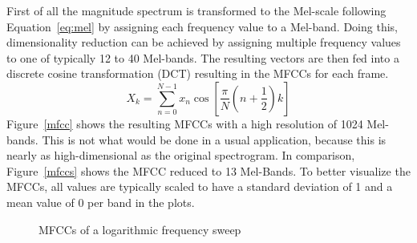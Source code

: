 \FloatBarrier
\noindent First of all the magnitude spectrum is transformed to the Mel-scale following Equation~\eqref{eq:mel} by assigning each frequency value to a Mel-band.
Doing this, dimensionality reduction can be achieved by assigning multiple frequency values to one of typically 12 to 40 Mel-bands. The resulting vectors are then fed into a discrete cosine transformation (DCT) resulting in the MFCCs for each frame. 
\begin{equation} \label{eq:dct}
X_k = \sum_{n=0}^{N-1}{x_n \cos\left[{\frac{\pi}{N}(n + \frac{1}{2})k}\right]}
\end{equation}
Figure~\ref{mfcc} shows the resulting MFCCs with a high resolution of 1024 Mel-bands. This is not what would be done in a usual application, because this is nearly as high-dimensional as the original spectrogram. In comparison, Figure~\ref{mfccs} shows the MFCC reduced to 13 Mel-Bands.
To better visualize the MFCCs, all values are typically scaled to have a standard deviation of 1 and a mean value of 0 per band in the plots. 
\begin{figure}[htbp]
	\centering
	\caption{MFCCs of a logarithmic frequency sweep}	
	\label{fig:mfcc}
\end{figure}
